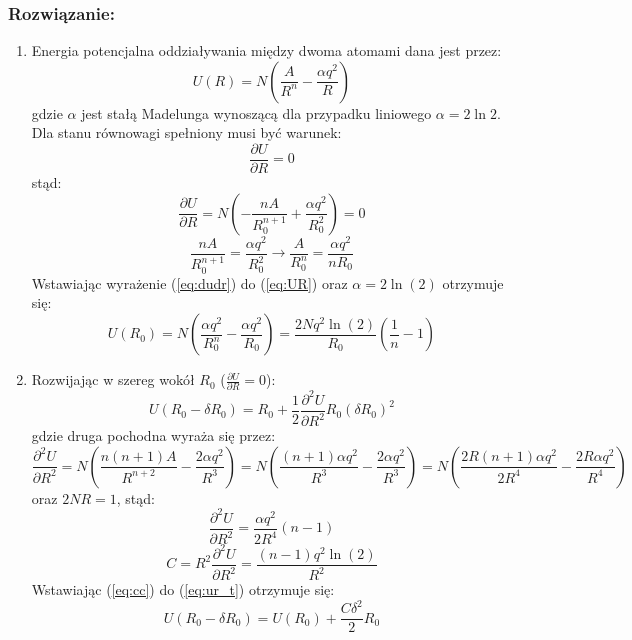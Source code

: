 \subsubsection*{Rozwiązanie:}
\begin{enumerate}
\item Energia potencjalna oddziaływania między dwoma atomami dana jest przez:
\begin{equation}
\label{eq:UR}
U(R) = N\left( \frac{A}{R^n} - \frac{\alpha q^2}{R} \right)
\end{equation}
gdzie $\alpha$ jest stałą Madelunga wynoszącą dla przypadku liniowego $\alpha = 2\ln 2$.\\
Dla stanu równowagi spełniony musi być warunek:
\begin{equation}
\frac{\partial U}{\partial R} = 0
\end{equation}
stąd:
\begin{equation}
\frac{\partial U}{\partial R} = N \left( -\frac{nA}{R_0^{n+1}} + \frac{\alpha q^2}{R_0^2} \right)= 0
\end{equation}
\begin{equation}
\label{eq:dudr}
\frac{nA}{R_0^{n+1}} = \frac{\alpha q^2}{R_0^2} \rightarrow \frac{A}{R_0^n} = \frac{\alpha q^2}{n R_0}
\end{equation}
Wstawiając wyrażenie (\ref{eq:dudr}) do (\ref{eq:UR}) oraz $\alpha=2\ln(2)$ otrzymuje się:
\begin{equation}
U(R_0) = N \left( \frac{\alpha q^2}{R_0^n} - \frac{\alpha q^2}{R_0} \right) = \frac{2Nq^2\ln(2)}{R_0} \left( \frac{1}{n} -1 \right)
\end{equation}
\hrulefill
\item Rozwijając w szereg wokół $R_0$ ($\frac{\partial U}{\partial R} =0 $):
\begin{equation}
\label{eq:ur_t}
U(R_0-\delta R_0 ) = R_0 + \frac{1}{2} \frac{\partial^2 U}{\partial R^2} R_0 (\delta R_0)^2
\end{equation}
gdzie druga pochodna wyraża się przez:
\begin{equation}
\frac{\partial^2 U}{\partial R^2} = N \left( \frac{n(n+1)A}{R^{n+2}} - \frac{2\alpha q^2}{R^3} \right) = N \left( \frac{(n+1)\alpha q^2}{R^3} - \frac{2\alpha q^2}{R^3} \right) = N \left( \frac{2R(n+1)\alpha q^2}{2R^4} - \frac{2R\alpha q^2}{R^4} \right)
\end{equation}
oraz $2NR=1$, stąd:
\begin{equation}
\frac{\partial^2 U}{\partial R^2} = \frac{\alpha q^2}{2R^4}(n-1)
\end{equation}
\begin{equation}
\label{eq:cc}
C = R^2 \frac{\partial^2 U}{\partial R^2} = \frac{(n-1)q^2\ln(2)}{R^2}
\end{equation}
Wstawiając (\ref{eq:cc}) do (\ref{eq:ur_t}) otrzymuje się:
\begin{equation}
U(R_0-\delta R_0 ) = U(R_0) + \frac{C\delta^2}{2}R_0 
\end{equation}
\end{enumerate}
\hrulefill
